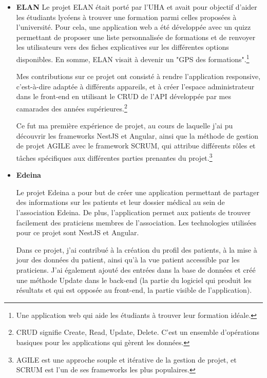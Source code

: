 \documentclass[12pt]{article}
\begin{document}
\begin{itemize}
\item \textbf{ELAN}
    \newline Le projet ELAN était porté par l'UHA et avait pour objectif d'aider les étudiants lycéens à trouver une formation parmi celles proposées à l'université. Pour cela, une application web a été développée avec un quizz permettant de proposer une liste personnalisée de formations et de renvoyer les utilisateurs vers des fiches explicatives sur les différentes options disponibles. En somme, ELAN visait à devenir un "GPS des formations".\footnote{Une application web qui aide les étudiants à trouver leur formation idéale.}

    \newline Mes contributions sur ce projet ont consisté à rendre l'application responsive, c'est-à-dire adaptée à différents appareils, et à créer l'espace administrateur dans le front-end en utilisant le CRUD de l'API développée par mes camarades des années supérieures.\footnote{CRUD signifie Create, Read, Update, Delete. C'est un ensemble d'opérations basiques pour les applications qui gèrent les données.}

     \newline Ce fut ma première expérience de projet, au cours de laquelle j'ai pu découvrir les frameworks NestJS et Angular, ainsi que la méthode de gestion de projet AGILE avec le framework SCRUM, qui attribue différents rôles et tâches spécifiques aux différentes parties prenantes du projet.\footnote{AGILE est une approche souple et itérative de la gestion de projet, et SCRUM est l'un de ses frameworks les plus populaires.}
    
    \item \textbf{Edeina}
   
        \newline Le projet Edeina a pour but de créer une application permettant de partager des informations sur les patients et leur dossier médical au sein de l'association Edeina. De plus, l'application permet aux patients de trouver facilement des praticiens membres de l'association. Les technologies utilisées pour ce projet sont NestJS et Angular.

        \newline Dans ce projet, j'ai contribué à la création du profil des patients, à la mise à jour des données du patient, ainsi qu'à la vue patient accessible par les praticiens. J'ai également ajouté des entrées dans la base de données et créé une méthode Update dans le back-end (la partie du logiciel qui produit les résultats et qui est opposée au front-end, la partie visible de l'application).


\end{itemize}
\end{document}
